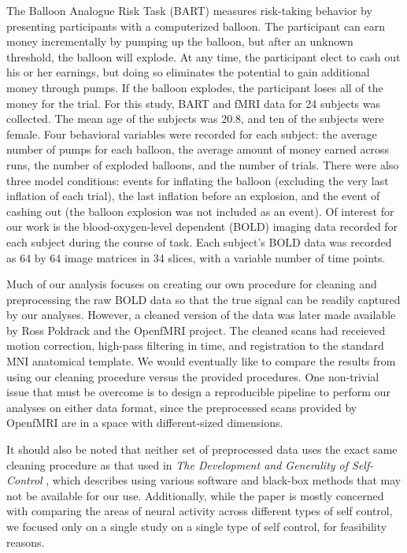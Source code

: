 \par \indent The Balloon Analogue Risk Task (BART) measures risk-taking 
behavior by presenting participants with a computerized balloon. The 
participant can earn money incrementally by pumping up the balloon, but after 
an unknown threshold, the balloon will explode. At any time, the participant 
elect to cash out his or her earnings, but doing so eliminates the potential to 
gain additional money through pumps. If the balloon explodes, the participant 
loses all of the money for the trial. For this study, BART and fMRI data for 24 
subjects was collected. The mean age of the subjects was 20.8, and ten of the 
subjects were female. Four behavioral variables were recorded for each subject: 
the average number of pumps for each balloon, the average amount of money 
earned across runs, the number of exploded balloons, and the number of trials. 
There were also three model conditions: events for inflating the balloon 
(excluding the very last inflation of each trial), the last inflation before an 
explosion, and the event of cashing out (the balloon explosion was not included 
as an event). Of interest for our work is the blood-oxygen-level dependent 
(BOLD) imaging data recorded for each subject during the course of task. Each 
subject's BOLD data was recorded as 64 by 64 image matrices in 34 slices, with 
a variable number of time points. 

\par Much of our analysis focuses on creating our own procedure for cleaning 
and preprocessing the raw BOLD data so that the true signal can be readily 
captured by our analyses. However, a cleaned version of the data was later made 
available by Ross Poldrack and the OpenfMRI project. The cleaned scans had 
receieved motion correction, high-pass filtering in time, and registration to the 
standard MNI anatomical template. We would eventually like to compare the 
results from using our cleaning procedure versus the provided procedures. One 
non-trivial issue that must be overcome is to design a reproducible pipeline to 
perform our analyses on either data format, since the preprocessed scans provided 
by OpenfMRI are in a space with different-sized dimensions. 

\par It should also be noted that neither set of preprocessed data uses the exact 
same cleaning procedure as that used in \textit{The Development and Generality of 
Self-Control} \cite{CohenSelfControl}, which describes using various software and 
black-box methods that may not be available for our use. Additionally, while the 
paper is mostly concerned with comparing the areas of neural activity across 
different types of self control, we focused only on a single study on a single 
type of self control, for feasibility reasons. 
